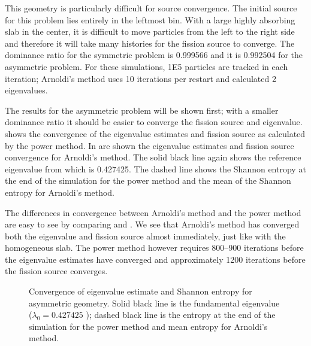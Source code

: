 This geometry is particularly difficult for source convergence.  The initial source for this problem lies entirely in the leftmost bin.  With a large highly absorbing slab in the center, it is difficult to move particles from the left to the right side and therefore it will take many histories for the fission source to converge.  The dominance ratio for the symmetric problem is 0.999566 and it is 0.992504 for the asymmetric problem.  For these simulations, 1E5 particles are tracked in each iteration; Arnoldi's method uses 10 iterations per restart and calculated 2 eigenvalues.

The results for the asymmetric problem will be shown first; with a smaller dominance ratio it should be easier to converge the fission source and eigenvalue.   shows the convergence of the eigenvalue estimates and fission source as calculated by the power method.  In  are shown the eigenvalue estimates and fission source convergence for Arnoldi's method.  The solid black line again shows the reference eigenvalue from \citet{Kornreich:2002Semi--0} which is 0.427425.  The dashed line shows the Shannon entropy at the end of the simulation for the power method and the mean of the Shannon entropy for Arnoldi's method.  

The differences in convergence between Arnoldi's method and the power method are easy to see by comparing  and .  We see that Arnoldi's method has converged both the eigenvalue and fission source almost immediately, just like with the homogeneous slab.  The power method however requires 800--900 iterations before the eigenvalue estimates have converged and approximately 1200 iterations before the fission source converges.

\begin{figure}[p]\centering

    \caption{Convergence of eigenvalue estimate and Shannon entropy for asymmetric geometry.  Solid black line is the fundamental eigenvalue ($\lambda_0 = 0.427425$ \cite{Kornreich:2002Semi--0}); dashed black line is the entropy at the end of the simulation for the power method and mean entropy for Arnoldi's method.}
\end{figure}

